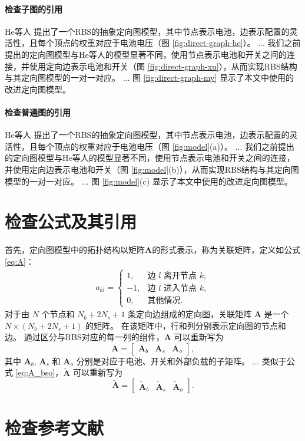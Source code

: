 \documentclass[a4paper,UTF8]{ctexart}
\begin{document}
\paragraph{检查子图的引用}
He等人 \cite{heExploringAdaptiveReconfiguration2013} 提出了一个RBS的抽象定向图模型，其中节点表示电池，边表示配置的灵活性，且每个顶点的权重对应于电池电压（图 \ref{fig:direct-graph-he}）。 
...
我们之前提出的定向图模型与He等人的模型显著不同，使用节点表示电池和开关之间的连接，并使用定向边表示电池和开关（图 \ref{fig:direct-graph-xu}），从而实现RBS结构与其定向图模型的一对一对应。
...
图 \ref{fig:direct-graph-my} 显示了本文中使用的改进定向图模型。

\paragraph{检查普通图的引用}
He等人 \cite{heExploringAdaptiveReconfiguration2013} 提出了一个RBS的抽象定向图模型，其中节点表示电池，边表示配置的灵活性，且每个顶点的权重对应于电池电压（图 \ref{fig:model}(a)）。 
...
我们之前提出的定向图模型与He等人的模型显著不同，使用节点表示电池和开关之间的连接，并使用定向边表示电池和开关（图 \ref{fig:model}(b)），从而实现RBS结构与其定向图模型的一对一对应。
...
图 \ref{fig:model}(c) 显示了本文中使用的改进定向图模型。

\section{检查公式及其引用}

首先，定向图模型中的拓扑结构以矩阵$\boldsymbol{A}$的形式表示，称为关联矩阵，定义如公式 \eqref{eq:A}：
\begin{align}\label{eq:A}
    a_{kl}=
    \begin{cases}
        1,  & \text{边 $l$ 离开节点 $k$},\\
        -1, & \text{边 $l$ 进入节点 $k$},\\
        0,  & \text{其他情况}.
    \end{cases}
\end{align}
对于由 $N$ 个节点和 $N_b+2N_s+1$ 条定向边组成的定向图，关联矩阵 $\boldsymbol{A}$ 是一个 $N\times(N_b+2N_s+1)$ 的矩阵。 
在该矩阵中，行和列分别表示定向图的节点和边。
通过区分与RBS对应的每一列的组件，$\boldsymbol{A}$ 可以重新写为
\begin{equation}\label{eq:A_bso}
    \boldsymbol{A} =
    \begin{bmatrix}
        \boldsymbol{A}_b & \boldsymbol{A}_s & \boldsymbol{A}_o
    \end{bmatrix},
\end{equation}
其中 $\boldsymbol{A}_b$, $\boldsymbol{A}_s$ 和 $\boldsymbol{A}_o$ 分别是对应于电池、开关和外部负载的子矩阵。
...
类似于公式 \eqref{eq:A_bso}，$\boldsymbol{\tilde{A}}$ 可以重新写为
\begin{equation}\label{eq:A_bso_tilde}
    \boldsymbol{\tilde{A}} =
    \begin{bmatrix}
        \boldsymbol{\tilde{A}}_b & \boldsymbol{\tilde{A}}_s & \boldsymbol{\tilde{A}}_o
    \end{bmatrix}.
\end{equation}

\section{检查参考文献}



\end{document}
